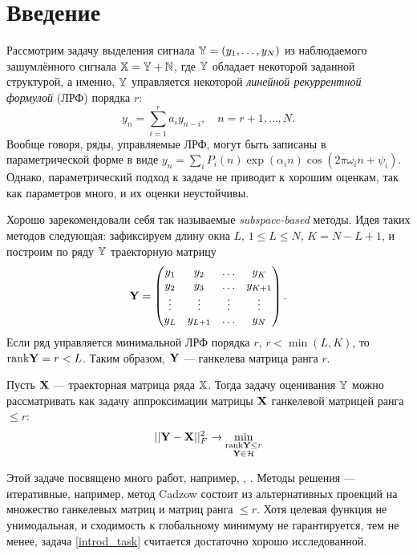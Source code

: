 \documentclass[12pt,a4paper,fleqn,leqno]{article}
\begin{document}
\section{Введение}
Рассмотрим задачу выделения сигнала $\mathbb{Y} = (y_1, \ldots, y_N)$ из наблюдаемого зашумлённого сигнала $\mathbb{X} = \mathbb{Y} + \mathbb{N}$, где $\mathbb{Y}$  обладает некоторой заданной структурой, а именно, $\mathbb{Y}$ управляется некоторой \emph{линейной рекуррентной формулой} (ЛРФ) порядка $r$:
\begin{equation*}
y_n = \sum_{i = 1}^{r} a_i y_{n-i}, \quad n = r + 1, \ldots, N.
\end{equation*}
Вообще говоря, ряды, управляемые ЛРФ, могут быть записаны в параметрической форме в виде $y_n = \sum_i P_i(n) \exp(\alpha_i n) \cos(2 \pi \omega_i n + \psi_i)$. Однако, параметрический подход к задаче не приводит к хорошим оценкам, так как параметров много, и их оценки неустойчивы.

Хорошо зарекомендовали себя так называемые \emph{subspace-based} методы. Идея таких методов следующая: зафиксируем длину окна $L$, $1 \le L \le N$, $K = N - L + 1$, и построим по ряду $\mathbb{Y}$ траекторную матрицу
\begin{equation*}
\mathbf{Y} = \begin{pmatrix}
y_1 & y_2 & \ldots & y_K \\
y_2 & y_3 & \ldots & y_{K + 1} \\
\vdots & \vdots & \vdots & \vdots \\
y_L & y_{L + 1} & \ldots & y_N
\end{pmatrix}.
\end{equation*}
Если ряд управляется минимальной ЛРФ порядка $r$, $r < \min(L, K)$, то $\text{rank} \mathbf{Y} = r < L$. Таким образом, $\mathbf{Y}$ --- ганкелева матрица ранга $r$.

Пусть $\mathbf{X}$ --- траекторная матрица ряда $\mathbb{X}$. Тогда задачу оценивания $\mathbb{Y}$ можно рассматривать как задачу аппроксимации матрицы $\mathbf{X}$ ганкелевой матрицей ранга $\le r$:
\begin{equation}\label{introd_task}
||\mathbf{Y} - \mathbf{X}||^2_F \to \min_{\substack{\text{rank} \mathbf{Y} \le r \\ \mathbf{Y} \in \mathcal{H}}}
\end{equation}

Этой задаче посвящено много работ, например, \cite{Cadzow1988}, \cite{Gillard2014}. Методы решения --- итеративные, например, метод Cadzow состоит из альтернативных проекций на множество ганкелевых матриц и матриц ранга $\le r$. Хотя целевая функция не унимодальная, и сходимость к глобальному минимуму не гарантируется, тем не менее, задача \eqref{introd_task} считается достаточно хорошо исследованной.
\end{document}
